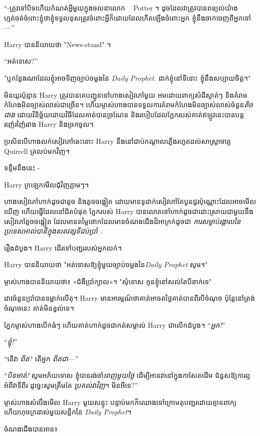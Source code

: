 “-ត្រូវ​ទៅ​បិទ​ហើយ​កំណត់​អ្វី​មួយ​ក្នុង​ចលនា​លោក ~ Potter ។ ដូចដែលវាត្រូវបានពន្យល់យ៉ាងហ្មត់ចត់ចំពោះខ្ញុំថាខ្ញុំទទួលខុសត្រូវចំពោះអ្វីក៏ដោយដែលកើតឡើងចំពោះអ្នក ខ្ញុំនឹងចាកចេញពីអ្នកទៅ—”

Harry បាននិយាយថា "News-stand" ។

“អត់ទោស?”

"ឬកន្លែងណាដែលខ្ញុំអាចទិញច្បាប់ចម្លងនៃ \emph{Daily Prophet.} ដាក់ខ្ញុំនៅទីនោះ ខ្ញុំនឹងសប្បាយចិត្ត។"

មិនយូរប៉ុន្មាន Harry ត្រូវបានគេបញ្ជូនទៅហាងសៀវភៅមួយ អមដោយពាក្យសំដីស្ងាត់ៗ និងគំរាមកំហែងមិនច្បាស់លាស់ជាច្រើន។ ហើយម្ចាស់ហាងបានទទួលការគំរាមកំហែងមិនច្បាស់លាស់ចំនួន\emph{តិចជាង} ដោយវិនិច្ឆ័យដោយវិធីដែលគាត់បានច្រណែន និងរបៀបដែលភ្នែករបស់គាត់ឥឡូវនេះបានបន្តរញ៉េរញ៉ៃរវាង Harry និងច្រកចូល។

ប្រសិនបើ​ហាង​លក់​សៀវភៅ​ឆេះ​នោះ Harry នឹង​នៅ​ជាប់​កណ្តាល​ភ្លើង​រហូត​ដល់​សាស្ត្រាចារ្យ Quirrell ត្រលប់​មក​វិញ។

ទន្ទឹមនឹងនេះ -

Harry ក្រឡេកមើលជុំវិញភ្លាមៗ។

ហាងសៀវភៅហាក់ដូចជាតូច និងតូចចង្អៀត ដោយមានទូដាក់សៀវភៅតែបួនជួរប៉ុណ្ណោះដែលអាចមើលឃើញ ហើយធ្នើដែលនៅជិតបំផុត ភ្នែករបស់ Harry បានលោតទៅហាក់ដូចជាដោះស្រាយជាមួយនឹងសៀវភៅតូចចង្អៀត ដែលមានតម្លៃថោកដែលមានចំណងជើងដ៏អាក្រក់ដូចជា \emph{ការសម្លាប់រង្គាលនៃប្រទេសអាល់បានីក្នុងសតវត្សទីដប់ប្រាំ .}

រឿងដំបូង។ Harry ដើរទៅបញ្ជររបស់អ្នកលក់។

Harry បាននិយាយថា "អត់ទោសឱ្យខ្ញុំមួយច្បាប់ចម្លងនៃ\emph{Daily Prophet} សូម។"

ម្ចាស់​ហាង​បាន​និយាយ​ថា​៖ «​ជំងឺ​ប្រាំ​ក្បាល​»​។ "សុំទោស កូនខ្ញុំនៅសល់តែបីនាក់ទេ"

ដាវចំនួនប្រាំបានទម្លាក់លើតុ។ Harry មាន​អារម្មណ៍​ថា​គាត់​អាច​តថ្លៃ​គាត់​បាន​ពីរបី​ចំណុច ប៉ុន្តែ​នៅ​ត្រង់​ចំណុច​នេះ គាត់​មិន​ខ្វល់​ទេ។

ភ្នែក​ម្ចាស់​ហាង​បើក​ធំៗ ហើយ​គាត់​ហាក់​ដូច​ជា​កត់​សម្គាល់ Harry ជា​លើក​ដំបូង។ “\emph{អ្នក!}”

“\emph{ខ្ញុំ!}”

“តើវា \emph{ពិត}? តើអ្នក \emph{ពិតជា}—”

“\emph{បិទមាត់!} សូមអភ័យទោស ខ្ញុំបានរង់ចាំ\emph{ពេញមួយថ្ងៃ} ដើម្បីអានវានៅក្នុងកាសែតដើម ជំនួសឱ្យការឮអំពីវាទីពីរ ដូច្នេះសូមត្រឹមតែ \emph{ប្រគល់វាវិញ}។ មិនអីទេ?”

ម្ចាស់ហាងសំលឹងមើល Harry មួយសន្ទុះ បន្ទាប់មកក៏ឈោងទៅក្រោមតុបញ្ជរដោយគ្មានពាក្យ ហើយហុចក្រដាស់មួយសន្លឹកនៃ \emph{Daily Prophet}។

ចំណងជើងបានអាន៖



